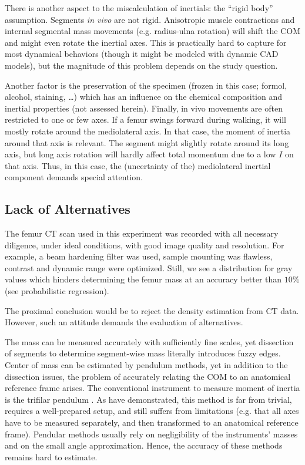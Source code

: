 There is another aspect to the miscalculation of inertials: the ``rigid body'' assumption.
Segments \emph{in vivo} are not rigid.
Anisotropic muscle contractions and internal segmental mass movements (e.g. radius-ulna rotation) will shift the COM and might even rotate the inertial axes.
This is practically hard to capture for most dynamical behaviors (though it might be modeled with dynamic CAD models), but the magnitude of this problem depends on the study question.

Another factor is the preservation of the specimen (frozen in this case; formol, alcohol, staining, \ldots{}) which has an influence on the chemical composition and inertial properties (not assessed herein).
Finally, in vivo movements are often restricted to one or few axes.
If a femur swings forward during walking, it will mostly rotate around the mediolateral axis.
In that case, the moment of inertia around that axis is relevant.
The segment might slightly rotate around its long axis, but long axis rotation will hardly affect total momentum due to a low \(I\) on that axis.
Thus, in this case, the (uncertainty of the) mediolateral inertial component demands special attention.


\subsection{Lack of Alternatives}
\label{sec:orgb7fdaee}
The femur CT scan used in this experiment was recorded with all necessary diligence, under ideal conditions, with good image quality and resolution.
For example, a beam hardening filter was used, sample mounting was flawless, contrast and dynamic range were optimized.
Still, we see a distribution for gray values which hinders determining the femur mass at an accuracy better than \(10 \%\) (see probabilistic regression).

The proximal conclusion would be to reject the density estimation from CT data.
However, such an attitude demands the evaluation of alternatives.



The mass can be measured accurately with sufficiently fine scales, yet dissection of segments to determine segment-wise mass literally introduces fuzzy edges.
Center of mass can be estimated by pendulum methods, yet in addition to the dissection issues, the problem of accurately relating the COM to an anatomical reference frame arises.
The conventional instrument to measure moment of inertia is the trifilar pendulum \citep{Korr1962,Wells1987,Schedlinski2001}.
As \citet{Durston2022} have demonstrated, this method is far from trivial, requires a well-prepared setup, and still suffers from limitations (e.g. that all axes have to be measured separately, and then transformed to an anatomical reference frame).
Pendular methods usually rely on negligibility of the instruments' masses and on the small angle approximation.
Hence, the accuracy of these methods remains hard to estimate.


